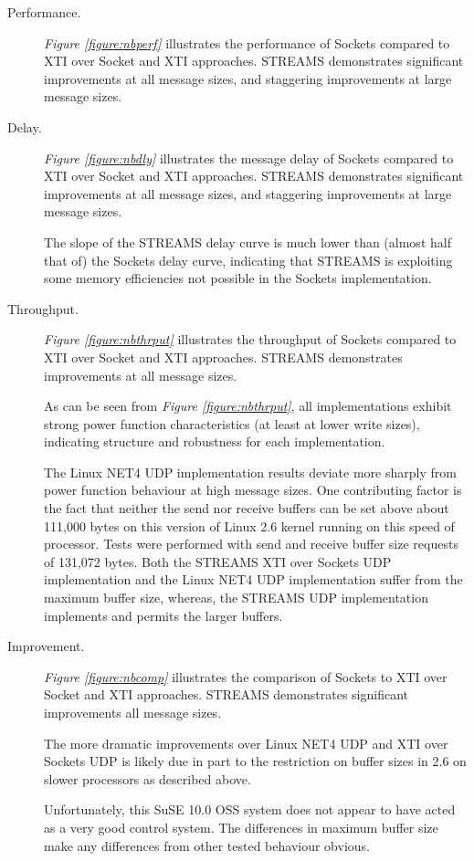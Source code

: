 \documentclass[letterpaper,final,notitlepage,twocolumn,10pt,twoside]{article}
\begin{document}
\begin{description}

\item[Performance.]

\textit{Figure \ref{figure:nbperf}}
illustrates
the performance of Sockets compared to XTI over Socket and XTI approaches.
STREAMS demonstrates significant improvements at all message sizes, and
staggering improvements at large message sizes.

\item[Delay.]

\textit{Figure \ref{figure:nbdly}}
illustrates
the message delay of Sockets compared to XTI over Socket and XTI approaches.
STREAMS demonstrates significant improvements at all message sizes, and
staggering improvements at large message sizes.

The slope of the STREAMS delay curve is much lower than (almost half that of)
the Sockets delay curve, indicating that STREAMS is exploiting some memory
efficiencies not possible in the Sockets implementation.

\item[Throughput.]

\textit{Figure \ref{figure:nbthrput}}
illustrates the throughput of Sockets compared to XTI over Socket and XTI
approaches.  STREAMS demonstrates improvements at all message sizes.

As can be seen from \textit{Figure \ref{figure:nbthrput}}, all
implementations exhibit strong power function characteristics (at least at
lower write sizes), indicating structure and robustness for each
implementation.

The Linux NET4 UDP implementation results deviate more sharply from power
function behaviour at high message sizes.  One contributing factor is the fact
that neither the send nor receive buffers can be set above about 111,000 bytes
on this version of Linux 2.6 kernel running on this speed of processor.  Tests
were performed with send and receive buffer size requests of 131,072 bytes.
Both the STREAMS XTI over Sockets UDP implementation and the Linux NET4 UDP
implementation suffer from the maximum buffer size, whereas, the STREAMS UDP
implementation implements and permits the larger buffers.

\item[Improvement.]

\textit{Figure \ref{figure:nbcomp}}
illustrates
the comparison of Sockets to XTI over Socket and XTI approaches.  STREAMS
demonstrates significant improvements all message sizes.

The more dramatic improvements over Linux NET4 UDP and XTI over Sockets UDP is
likely due in part to the restriction on buffer sizes in 2.6 on slower
processors as described above.

Unfortunately, this SuSE 10.0 OSS system does not appear to have acted as a very
good control system.  The differences in maximum buffer size make any
differences from other tested behaviour obvious.

\end{description}
\end{document}
